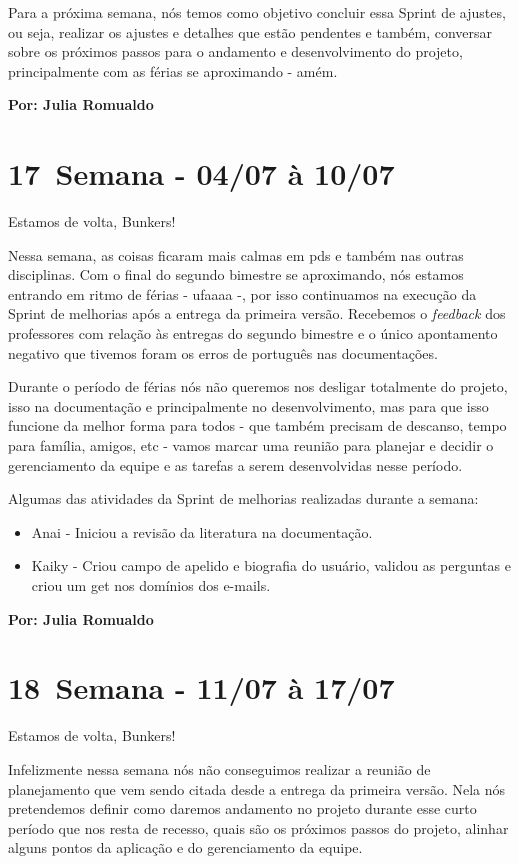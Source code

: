 Para a próxima semana, nós temos como objetivo concluir essa \gls{Sprint} de ajustes, ou seja, realizar os ajustes e detalhes que estão pendentes e também, conversar sobre os próximos passos para o andamento e desenvolvimento do projeto, principalmente com as férias se aproximando - amém.

\textbf{Por: Julia Romualdo}

\section{17\textordfeminine \, Semana - 04/07 à 10/07}
Estamos de volta, Bunkers!

Nessa semana, as coisas ficaram mais calmas em \acs{pds} e também nas outras disciplinas. Com o final do segundo bimestre se aproximando, nós estamos entrando em ritmo de férias - ufaaaa -, por isso continuamos na execução da \gls{Sprint} de melhorias após a entrega da primeira versão. Recebemos o \textit{feedback} dos professores com relação às entregas do segundo bimestre e o único apontamento negativo que tivemos foram os erros de português nas documentações. 

Durante o período de férias nós não queremos nos desligar totalmente do projeto, isso na documentação e principalmente no desenvolvimento, mas para que isso funcione da melhor forma para todos - que também precisam de descanso, tempo para família, amigos, etc - vamos marcar uma reunião para planejar e decidir o gerenciamento da equipe e as tarefas a serem desenvolvidas nesse período.

Algumas das atividades da \gls{Sprint} de melhorias realizadas durante a semana:
\begin{itemize}
    \item Anai - Iniciou a revisão da literatura na documentação.
    \item Kaiky - Criou campo de apelido e biografia do usuário, validou as perguntas e criou um get nos domínios dos e-mails.
\end{itemize}

\textbf{Por: Julia Romualdo}

\section{18\textordfeminine \, Semana - 11/07 à 17/07}
Estamos de volta, Bunkers!

Infelizmente nessa semana nós não conseguimos realizar a reunião de planejamento que vem sendo citada desde a entrega da primeira versão. Nela nós pretendemos definir como daremos andamento no projeto durante esse curto período que nos resta de recesso, quais são os próximos passos do projeto, alinhar alguns pontos da aplicação e do gerenciamento da equipe. 

